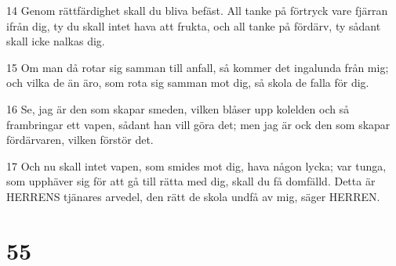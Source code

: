 \par 14 Genom rättfärdighet skall du bliva befäst. All tanke på förtryck vare fjärran ifrån dig, ty du skall intet hava att frukta, och all tanke på fördärv, ty sådant skall icke nalkas dig.
\par 15 Om man då rotar sig samman till anfall, så kommer det ingalunda från mig; och vilka de än äro, som rota sig samman mot dig, så skola de falla för dig.
\par 16 Se, jag är den som skapar smeden, vilken blåser upp kolelden och så frambringar ett vapen, sådant han vill göra det; men jag är ock den som skapar fördärvaren, vilken förstör det.
\par 17 Och nu skall intet vapen, som smides mot dig, hava någon lycka; var tunga, som upphäver sig för att gå till rätta med dig, skall du få domfälld. Detta är HERRENS tjänares arvedel, den rätt de skola undfå av mig, säger HERREN.

\chapter{55}

